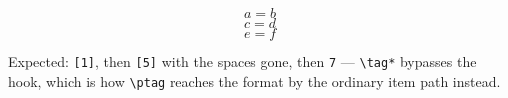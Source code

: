 \documentclass{article}
\begin{document}
\begingroup
{}
\begin{equation} a = b \end{equation}
\begin{equation} c = d \tag{ 5 } \end{equation}
\begin{equation} e = f \tag*{ 7 } \end{equation}
\endgroup

Expected: \texttt{[1]}, then \texttt{[5]} with the spaces gone, then
\texttt{7} --- \verb|\tag*| bypasses the hook, which is how \verb|\ptag|
reaches the format by the ordinary item path instead.
\end{document}
